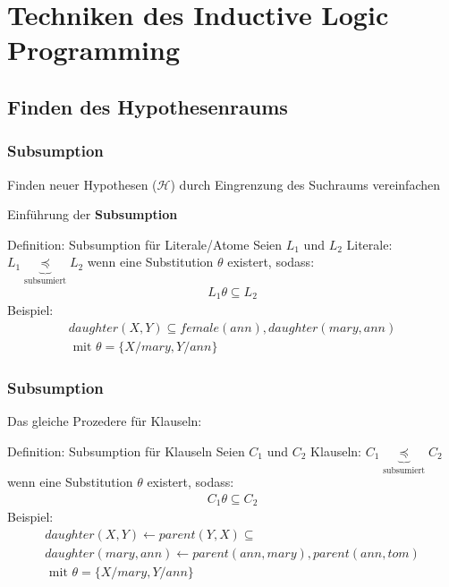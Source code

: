 \section{Techniken des Inductive Logic Programming}
\subsection{Finden des Hypothesenraums}
\begin{frame}
	\frametitle{Subsumption}
	Finden neuer Hypothesen ($\mathcal{H}$) durch Eingrenzung des Suchraums vereinfachen

	Einführung der \textbf{Subsumption}
	\begin{block}{Definition: Subsumption für Literale/Atome}
		Seien $L_1$ und $L_2$ Literale: $L_1 \underbrace{\preceq}_{\text{subsumiert}} L_2$
		wenn eine Substitution $\theta$ existert, sodass:
		\begin{align*}
			 L_1 \theta \subseteq L_2
		\end{align*}
		Beispiel:
		\begin{align*}
			 daughter(X, Y)  \subseteq female(ann), daughter(mary, ann)\\\text{  mit  } \theta = \{X/mary, Y/ann\}
		\end{align*}
	\end{block}
\end{frame}
\begin{frame}
	\frametitle{Subsumption}
	Das gleiche Prozedere für Klauseln:
	\begin{block}{Definition: Subsumption für Klauseln}
		Seien $C_1$ und $C_2$ Klauseln: $C_1 \underbrace{\preceq}_{\text{subsumiert}} C_2$
		wenn eine Substitution $\theta$ existert, sodass:
		\begin{align*}
			 C_1 \theta \subseteq C_2
		\end{align*}
		Beispiel:
		\begin{gather*}
			 daughter(X, Y) \leftarrow parent(Y,X) \subseteq\\
			 daughter(mary, ann) \leftarrow parent(ann, mary), parent(ann, tom)\\
			 \text{  mit  } \theta = \{X/mary, Y/ann\}
		\end{gather*}
	\end{block}
\end{frame}

